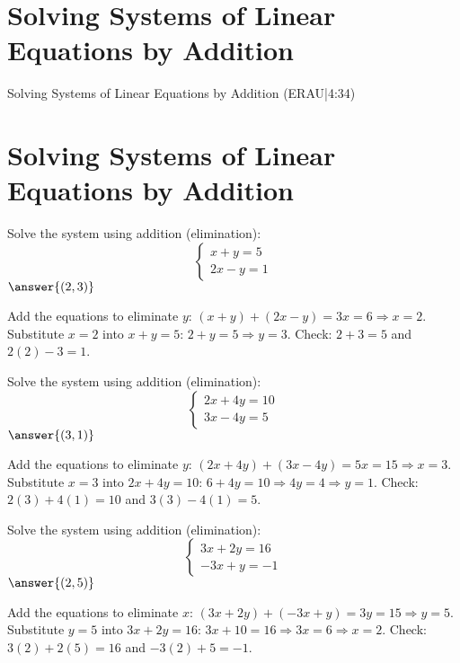 \documentclass{ximera}
\begin{document}

\section*{Solving Systems of Linear Equations by Addition}

Solving Systems of Linear Equations by Addition (ERAU|4:34)


\section*{Solving Systems of Linear Equations by Addition}

\begin{problem}
Solve the system using addition (elimination):
\[
\begin{cases}
x + y = 5\\
2x - y = 1
\end{cases}
\]
$\answer{(2,3)}$
\begin{feedback}
Add the equations to eliminate $y$: $(x+y)+(2x-y)=3x=6\Rightarrow x=2$. Substitute $x=2$ into $x+y=5$: $2+y=5\Rightarrow y=3$. Check: $2+3=5$ and $2(2)-3=1$.
\end{feedback}
\end{problem}

\begin{problem}
Solve the system using addition (elimination):
\[
\begin{cases}
2x + 4y = 10\\
3x - 4y = 5
\end{cases}
\]
$\answer{(3,1)}$
\begin{feedback}
Add the equations to eliminate $y$: $(2x+4y)+(3x-4y)=5x=15\Rightarrow x=3$. Substitute $x=3$ into $2x+4y=10$: $6+4y=10\Rightarrow 4y=4\Rightarrow y=1$. Check: $2(3)+4(1)=10$ and $3(3)-4(1)=5$.
\end{feedback}
\end{problem}

\begin{problem}
Solve the system using addition (elimination):
\[
\begin{cases}
3x + 2y = 16\\
-3x + y = -1
\end{cases}
\]
$\answer{(2,5)}$
\begin{feedback}
Add the equations to eliminate $x$: $(3x+2y)+(-3x+y)=3y=15\Rightarrow y=5$. Substitute $y=5$ into $3x+2y=16$: $3x+10=16\Rightarrow 3x=6\Rightarrow x=2$. Check: $3(2)+2(5)=16$ and $-3(2)+5=-1$.
\end{feedback}
\end{problem}
\end{document}
